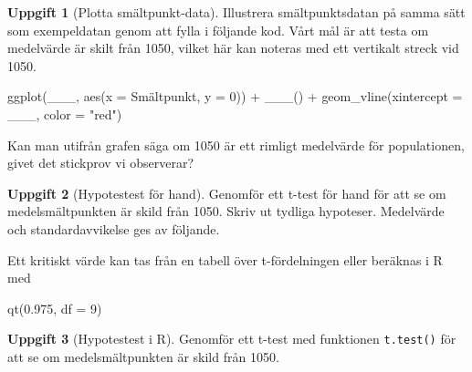 \documentclass[
]{book}
\newenvironment{Shaded}{\begin{snugshade}}{\end{snugshade}}
\newcommand{\AttributeTok}[1]{\textcolor[rgb]{0.77,0.63,0.00}{#1}}
\newcommand{\DecValTok}[1]{\textcolor[rgb]{0.00,0.00,0.81}{#1}}
\newcommand{\FloatTok}[1]{\textcolor[rgb]{0.00,0.00,0.81}{#1}}
\newcommand{\FunctionTok}[1]{\textcolor[rgb]{0.00,0.00,0.00}{#1}}
\newcommand{\NormalTok}[1]{#1}
\newcommand{\SpecialCharTok}[1]{\textcolor[rgb]{0.00,0.00,0.00}{#1}}
\newcommand{\StringTok}[1]{\textcolor[rgb]{0.31,0.60,0.02}{#1}}
\theoremstyle{definition}
\theoremstyle{definition}
\theoremstyle{definition}
\newtheorem{exercise}{Uppgift}[chapter]
\theoremstyle{definition}
\theoremstyle{remark}
\begin{document}
\begin{exercise}[Plotta smältpunkt-data]
Illustrera smältpunktsdatan på samma sätt som exempeldatan genom att fylla i följande kod. Vårt mål är att testa om medelvärde är skilt från 1050, vilket här kan noteras med ett vertikalt streck vid 1050.

\begin{Shaded}
\begin{Highlighting}[]
\FunctionTok{ggplot}\NormalTok{(\_\_\_, }\FunctionTok{aes}\NormalTok{(}\AttributeTok{x =}\NormalTok{ Smältpunkt, }\AttributeTok{y =} \DecValTok{0}\NormalTok{)) }\SpecialCharTok{+} 
  \FunctionTok{\_\_\_}\NormalTok{() }\SpecialCharTok{+}
  \FunctionTok{geom\_vline}\NormalTok{(}\AttributeTok{xintercept =}\NormalTok{ \_\_\_, }\AttributeTok{color =} \StringTok{"red"}\NormalTok{)}
\end{Highlighting}
\end{Shaded}

Kan man utifrån grafen säga om 1050 är ett rimligt medelvärde för populationen, givet det stickprov vi observerar?
\end{exercise}

\begin{exercise}[Hypotestest för hand]

Genomför ett t-test för hand för att se om medelsmältpunkten är skild från 1050. Skriv ut tydliga hypoteser. Medelvärde och standardavvikelse ges av följande.

\begin{Shaded}
\end{Shaded}

Ett kritiskt värde kan tas från en tabell över t-fördelningen eller beräknas i R med

\begin{Shaded}
\begin{Highlighting}[]
\FunctionTok{qt}\NormalTok{(}\FloatTok{0.975}\NormalTok{, }\AttributeTok{df =} \DecValTok{9}\NormalTok{)}
\end{Highlighting}
\end{Shaded}

\end{exercise}

\begin{exercise}[Hypotestest i R]
Genomför ett t-test med funktionen \texttt{t.test()} för att se om medelsmältpunkten är skild från 1050.
\end{exercise}
\end{document}
